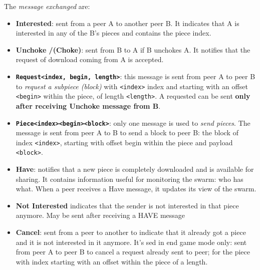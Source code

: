 \documentclass[10pt,a4paper]{report}
\begin{document}
The \textit{message exchanged} are:
\begin{itemize}
	\item 
	\textbf{Interested}: sent from a peer A to another peer B.  It indicates that A is interested in any of the B’s pieces and contains the piece index.
	\item 
	\textbf{Unchoke /(Choke)}: sent from B to A if B unchokes A. It notifies that the request of download coming from A is accepted.
	\item 
	\textbf{\texttt{Request<index, begin, length>}}: this message is sent from peer A to peer B to \textit{request a subpiece (block)} with \texttt{<index>} index and starting with an offset \texttt{<begin>} within the piece, of length \texttt{<length>}. A requested can be sent \textbf{only after receiving Unchoke message from B}.
	\item 
	\textbf{\texttt{Piece<index><begin><block>}}: only one message is used to \textit{send pieces}. The message is sent from peer A to B to send a block to peer B: the block of index \texttt{<index>}, starting with offset begin within the piece and payload  \texttt{<block>}.
	\item 
	\textbf{Have}: notifies that a new piece is completely downloaded and is available for sharing.  It contains information useful for monitoring the swarm: who has what. When a peer receives a Have message, it updates its view of the swarm.
	\item 
	\textbf{Not Interested} indicates that the sender is not interested in that piece anymore. May be sent after receiving a HAVE message
	\item 
	\textbf{Cancel}: sent from a peer to another to indicate that it already got a piece and it is not interested in it anymore. It's sed in end game mode only: sent from peer A to peer B to cancel a request already sent to peer;  for the piece with index starting with an offset within the piece of a length.
\end{itemize}
\end{document}
